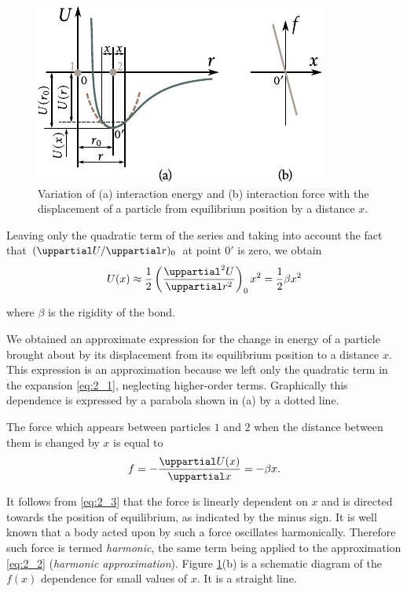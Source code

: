 \begin{figure}[t]
	\begin{center}
		\includegraphics[scale=1.1]{figures/ch_02/fig_2_1.pdf}
		\caption[]{Variation of (a) interaction energy and (b) interaction force with the displacement of a particle from equilibrium position by a distance $x$.}
		\label{fig:2_1}
	\end{center}
	\vspace{-0.7cm}
\end{figure}

Leaving only the quadratic term of the series and taking into account the fact that $(\diffinpartial{U}{r})_0$ at point $0'$ is zero, we obtain
\begin{equation}\label{eq:2_2}
	U(x) \approx \frac{1}{2} \parenthesis{\diffnpartial{U}{r}{2}}_0 x^2 = \frac{1}{2} \beta x^2
\end{equation}

\noindent
where $\beta$ is the rigidity of the bond.

We obtained an approximate expression for the change in energy of a particle brought about by its displacement from its equilibrium position to a distance $x$. This expression is an approximation because we left only the quadratic term in the expansion \eqref{eq:2_1}, neglecting higher-order terms. Graphically this dependence is expressed by a parabola shown in (a) by a dotted line.

The force which appears between particles $1$ and $2$ when the distance between them is changed by $x$ is equal to
\begin{equation}\label{eq:2_3}
	f = - \diffpartial{U(x)}{x} = - \beta x.
\end{equation}

It follows from \eqref{eq:2_3} that the force is linearly dependent on $x$ and is directed towards the position of equilibrium, as indicated by the minus sign. It is well known that a body acted upon by such a force oscillates harmonically. Therefore such force is termed \textit{harmonic}, the same term being applied to the approximation \eqref{eq:2_2} (\textit{harmonic approximation}). Figure \ref{fig:2_1}(b) is a schematic diagram of the $f(x)$ dependence for small values of $x$. It is a straight line.

